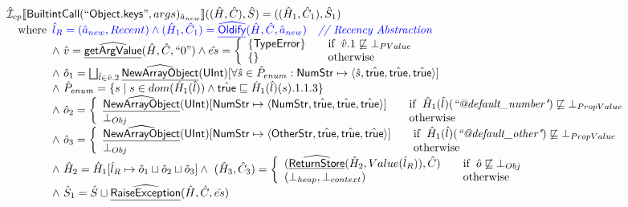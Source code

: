 \[\begin{array}{l}
\aI _{cp}\lbr \SF{BuiltintCall}(``\SF{Object.keys}",args)_{\hat{a}_{new}}\rbr((\hat{H},\hat{C}), \hat{S})
  = ((\hat{H}_1, \hat{C}_1), \hat{S}_1)\\
\quad\wherec{
  \inblue\hat{l}_{R} = (\hat{a}_{new}, Recent)
  \land \inblue (\hat{H}_1, \hat{C}_1) = \ahf{Oldify}(\hat{H}, \hat{C}, \hat{a}_{new})
     \quad\comment{{\inblue // Recency Abstraction}}\\
  \land\ \hat{v} =\ahf{getArgValue}(\hat{H}, \hat{C}, ``0")
  \land \hat{es} =
    \left\{
    \begin{array}{l@{\quad\quad}l}
      \{ \SF{TypeError} \} & \ifc{\hat{v}.1 \not\sqsubseteq \bot_{PValue}}\\
      \{ \}& \owc\\
    \end{array}
    \right.\\
  \land\ \hat{o}_1 = \bigsqcup_{\hat{l} \in \hat{v}.2} \ahf{NewArrayObject}(\SF{UInt})
    [\forall \hat{s}\in \hat{P}_{enum}: \SF{NumStr} \mapsto \langle \hat{s}, \atrue, \atrue, \atrue \rangle]\\
  \land\ \hat{P}_{enum} = \{ s \mid s \in dom(\hat{H}_1(\hat{l})) \land \atrue \sqsubseteq \hat{H}_1(\hat{l})(s).1.1.3\}\\
  \land\ \hat{o}_2 = \left\{
    \begin{array}{l@{\quad\quad}l}
      \ahf{NewArrayObject}(\SF{UInt})[\SF{NumStr} \mapsto  \langle \SF{NumStr}, \atrue, \atrue, \atrue \rangle]
        & \ifc{ \hat{H}_1(\hat{l})(\emph{``@default\_number"}) \not\sqsubseteq \bot_{PropValue}}\\
      \bot_{Obj} & \owc\\
    \end{array}
    \right.\\
  \land\ \hat{o}_3 = \left\{
    \begin{array}{l@{\quad\quad}l}
      \ahf{NewArrayObject}(\SF{UInt})[\SF{NumStr} \mapsto  \langle \SF{OtherStr}, \atrue, \atrue, \atrue \rangle]
        & \ifc{ \hat{H}_1(\hat{l})(\emph{``@default\_other"}) \not\sqsubseteq \bot_{PropValue}}\\
      \bot_{Obj} & \owc\\
    \end{array}
    \right.\\
  \land\ \hat{H}_2 = \hat{H}_1[\hat{l}_R \mapsto \hat{o}_1 \sqcup \hat{o}_2 \sqcup \hat{o}_3]
  \land\ (\hat{H}_3, \hat{C}_3) = 
    \left\{\begin{array}{l@{\quad\quad}l}
      (\ahf{ReturnStore}(\hat{H}_2, Value(\hat{l}_R)), \hat{C})
      & \ifc{\hat{o} \not\sqsubseteq \bot_{Obj}}\\
      (\bot_{heap}, \bot_{context}) & \owc \\
    \end{array}\right.\\
  \land\ \hat{S}_1 = \hat{S} \sqcup \ahf{RaiseException}(\hat{H}, \hat{C}, \hat{es})\\
  }\\
\\\\ 

\end{array}
\]


